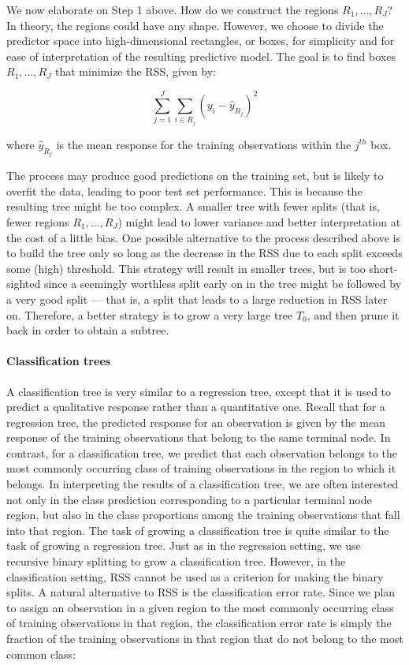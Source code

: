 We now elaborate on Step 1 above. How do we construct the regions $R_1, ..., R_J$? In theory, the
regions could have any shape. However, we choose to divide the predictor space into high-dimensional
rectangles, or boxes, for simplicity and for ease of interpretation of the resulting predictive
model. The goal is to find boxes $R_1, ..., R_J$ that minimize the RSS, given by:

$$\sum_{j=1}^{J} \sum_{i \in R_j} (y_i - \hat{y}_{R_j})^2$$

where $\hat{y}_{R_j}$ is the mean response for the training observations within the $j^{th}$ box.

The process may produce good predictions on the training set, but is likely to overfit the data,
leading to poor test set performance. This is because the resulting tree might be too complex. A
smaller tree with fewer splits (that is, fewer regions $R_1, ..., R_J$) might lead to lower variance
and better interpretation at the cost of a little bias. One possible alternative to the process
described above is to build the tree only so long as the decrease in the RSS due to each split
exceeds some (high) threshold. This strategy will result in smaller trees, but is too short-sighted
since a seemingly worthless split early on in the tree might be followed by a very good split — that
is, a split that leads to a large reduction in RSS later on. Therefore, a better strategy is to grow
a very large tree $T_0$, and then prune it back in order to obtain a subtree.

\paragraph{Classification trees}
A classification tree is very similar to a regression tree, except that it is used to predict a
qualitative response rather than a quantitative one. Recall that for a regression tree, the
predicted response for an observation is given by the mean response of the training observations
that belong to the same terminal node. In contrast, for a classification tree, we predict that each
observation belongs to the most commonly occurring class of training observations in the region to
which it belongs. In interpreting the results of a classification tree, we are often interested not
only in the class prediction corresponding to a particular terminal node region, but also in the
class proportions among the training observations that fall into that region. The task of growing a
classification tree is quite similar to the task of growing a regression tree. Just as in the
regression setting, we use recursive binary splitting to grow a classification tree. However, in the
classification setting, RSS cannot be used as a criterion for making the binary splits. A natural
alternative to RSS is the classification error rate. Since we plan to assign an observation in a
given region to the most commonly occurring class of training observations in that region, the
classification error rate is simply the fraction of the training observations in that region that do
not belong to the most common class:

